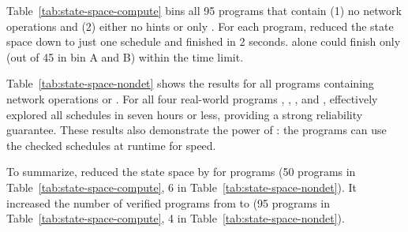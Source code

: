 Table~\ref{tab:state-space-compute} bins all 95 programs that contain
(1) no network operations and (2) either no hints or only \computes. For each 
program,
\ecosys reduced the state space down to just one
schedule and finished in 2 seconds. \dbug alone could finish only
\nprogverifieddbug (out of 45 in bin A and B) within the time limit.

Table~\ref{tab:state-space-nondet} shows the results for all
\nprognondetandnetwork programs containing network operations or
\nondets.  For all four real-world programs \pfscan, \partition,
\nthelement, and \partialsort, \ecosys effectively explored all
schedules in seven hours or less, providing a strong reliability
guarantee.  These results also demonstrate the power of \parrot:
the programs can use the checked schedules at runtime for speed.

To summarize, \parrot reduced the state space by \shrinkscale for
\nprogshrink programs (50 programs in Table~\ref{tab:state-space-compute},
6 in Table~\ref{tab:state-space-nondet}).  It increased the number of
verified programs from \nprogverifieddbug to \nprogverifiedxxx (95
programs in Table~\ref{tab:state-space-compute}, 4 in
Table~\ref{tab:state-space-nondet}).

